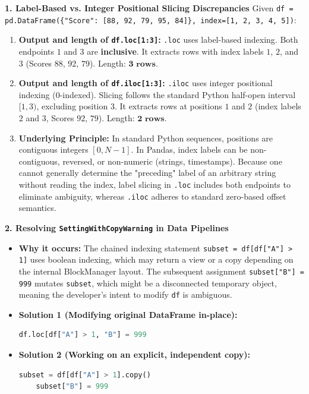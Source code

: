 \textbf{1. Label-Based vs. Integer Positional Slicing Discrepancies}
Given \texttt{df = pd.DataFrame(\{"Score": [88, 92, 79, 95, 84]\}, index=[1, 2, 3, 4, 5])}:
\begin{enumerate}
    \item \textbf{Output and length of \texttt{df.loc[1:3]}:}
    \texttt{.loc} uses label-based indexing. Both endpoints $1$ and $3$ are \textbf{inclusive}.
    It extracts rows with index labels $1$, $2$, and $3$ (Scores $88$, $92$, $79$).
    Length: $\mathbf{3 \text{ rows}}$.
    \item \textbf{Output and length of \texttt{df.iloc[1:3]}:}
    \texttt{.iloc} uses integer positional indexing (0-indexed). Slicing follows the standard Python half-open interval $[1, 3)$, excluding position 3.
    It extracts rows at positions $1$ and $2$ (index labels $2$ and $3$, Scores $92$, $79$).
    Length: $\mathbf{2 \text{ rows}}$.
    \item \textbf{Underlying Principle:}
    In standard Python sequences, positions are contiguous integers $[0, N-1]$. In Pandas, index labels can be non-contiguous, reversed, or non-numeric (strings, timestamps). Because one cannot generally determine the "preceding" label of an arbitrary string without reading the index, label slicing in \texttt{.loc} includes both endpoints to eliminate ambiguity, whereas \texttt{.iloc} adheres to standard zero-based offset semantics.
\end{enumerate}

\textbf{2. Resolving \texttt{SettingWithCopyWarning} in Data Pipelines}
\begin{itemize}
    \item \textbf{Why it occurs:} The chained indexing statement \texttt{subset = df[df["A"] > 1]} uses boolean indexing, which may return a view or a copy depending on the internal BlockManager layout. The subsequent assignment \texttt{subset["B"] = 999} mutates \texttt{subset}, which might be a disconnected temporary object, meaning the developer's intent to modify \texttt{df} is ambiguous.
    \item \textbf{Solution 1 (Modifying original DataFrame in-place):}
    \begin{lstlisting}[language=Python]
    df.loc[df["A"] > 1, "B"] = 999
    \end{lstlisting}
    \item \textbf{Solution 2 (Working on an explicit, independent copy):}
    \begin{lstlisting}[language=Python]
    subset = df[df["A"] > 1].copy()
    subset["B"] = 999
    \end{lstlisting}
\end{itemize}

